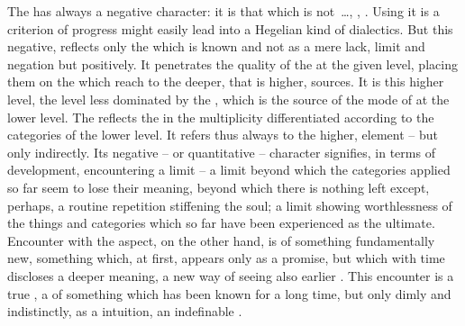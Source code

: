 \noindent
The  has always a negative character: it is that which is
not~\ldots \herenow, , .  Using it is a criterion of progress
might easily lead into a Hegelian kind of dialectics.  But this negative,
 reflects only the  which is known and
 not as a mere lack, limit and negation but positively. It
penetrates the quality of the  at the given level, placing them
on the  which reach to the deeper, that is higher, sources.  It is
this higher level, the level less dominated by the , which is the
source of the mode of  at the lower level.  The
 reflects the  in the multiplicity
differentiated according to the categories of the lower level. It refers thus
always to the higher,  element -- but only indirectly. Its negative
-- or quantitative -- character signifies, in terms of 
development, encountering a limit -- a limit beyond which the categories applied
so far seem to lose their meaning, beyond which there is nothing left except,
perhaps, a routine repetition stiffening the soul; a limit showing worthlessness
of the things and categories which so far have been experienced as the ultimate.
Encounter with the  aspect, on the other hand, is  of something fundamentally new, something which, at first, appears
only as a  promise, but which with time discloses a deeper meaning, a
new way of seeing also earlier .  This encounter is a true
, a  of something which has been known for a
long time, but only dimly and indistinctly, as a  intuition, an
indefinable .

